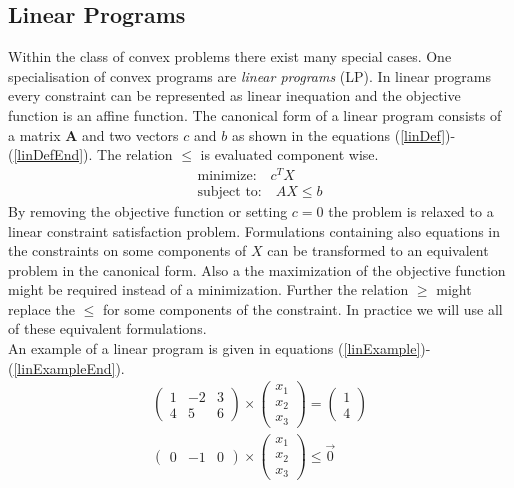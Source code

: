 \subsection{Linear Programs}
\label{sec:MathLinearProgram}
Within the class of convex problems there exist many special cases. One specialisation of convex programs are \emph{linear programs} (LP).
In linear programs every constraint can be represented as linear inequation and the objective function is an affine function. 
The canonical form of a linear program consists of a matrix $\mathbf{A}$ and two vectors ${c}$ and ${b}$ as shown in the equations (\ref{linDef})-(\ref{linDefEnd}). The relation $\leq$ is evaluated component wise.
\begin{eqnarray}
\label{linDef}
\text{minimize:}\quad {c}^TX \\
\label{linDefEnd}
\text{subject to:}\quad AX\leq{b}
\end{eqnarray}
By removing the objective function or setting ${c}={0}$ the problem is relaxed to a linear constraint satisfaction problem. Formulations containing also equations in the constraints on some components of $X$ can be transformed to an equivalent problem in the canonical form. Also a the maximization of the objective function might be required instead of a minimization. Further the relation $\geq$ might replace the $\leq$ for some components of the constraint. In practice we will use all of these equivalent formulations.\\

An example of a linear program is given in equations (\ref{linExample})-(\ref{linExampleEnd}).
\begin{eqnarray}
\label{linExample}
\begin{pmatrix}
1 & -2 & 3 \\
4 & 5 & 6 
\end{pmatrix}\times\begin{pmatrix}
x_1 \\ x_2 \\ x_3
\end{pmatrix} = \begin{pmatrix}
1 \\ 4
\end{pmatrix}\\
\begin{pmatrix}
0&-1&0
\end{pmatrix}\times\begin{pmatrix}
x_1 \\ x_2 \\ x_3
\label{linExampleEnd}
\end{pmatrix}\leq \vec{0}
\end{eqnarray}

